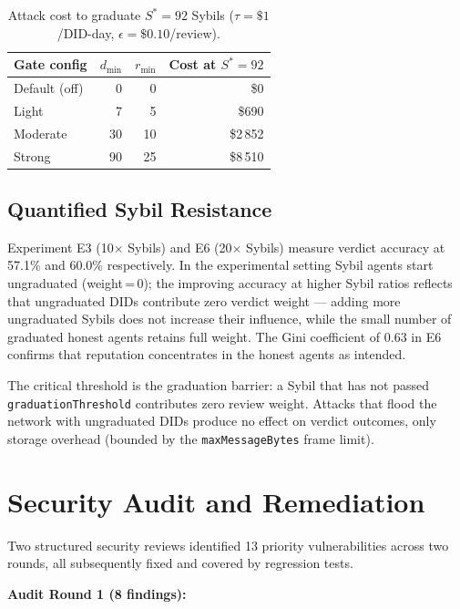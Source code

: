 \documentclass[10pt,twocolumn]{article}
\begin{document}
\begin{table}[h]
\centering
\small
\setlength{\tabcolsep}{4pt}
\caption{Attack cost to graduate $S^*=92$ Sybils ($\tau=\$1$/DID-day,
  $\epsilon=\$0.10$/review).}
\label{tab:attackcost}
\begin{tabular}{lrrr}
\toprule
\textbf{Gate config} & $d_{\min}$ & $r_{\min}$ & \textbf{Cost at $S^*=92$} \\
\midrule
Default (off)   & 0  & 0  & \$0       \\
Light           & 7  & 5  & \$690     \\
Moderate        & 30 & 10 & \$2\,852  \\
Strong          & 90 & 25 & \$8\,510  \\
\bottomrule
\end{tabular}
\end{table}

\subsection{Quantified Sybil Resistance}

Experiment E3 (10$\times$ Sybils) and E6 (20$\times$ Sybils) measure
verdict accuracy at 57.1\% and 60.0\% respectively. In the experimental
setting Sybil agents start ungraduated (weight\,=\,0); the improving
accuracy at higher Sybil ratios reflects that ungraduated DIDs contribute
zero verdict weight — adding more ungraduated Sybils does not increase
their influence, while the small number of graduated honest agents retains
full weight. The Gini coefficient of 0.63 in E6 confirms that reputation
concentrates in the honest agents as intended.

The critical threshold is the graduation barrier: a Sybil that has not
passed \texttt{graduationThreshold} contributes zero review weight. Attacks
that flood the network with ungraduated DIDs produce no effect on verdict
outcomes, only storage overhead (bounded by the \texttt{maxMessageBytes}
frame limit).

\section{Security Audit and Remediation}

Two structured security reviews identified 13 priority vulnerabilities across
two rounds, all subsequently fixed and covered by regression tests.

\textbf{Audit Round 1 (8 findings):}
\end{document}
